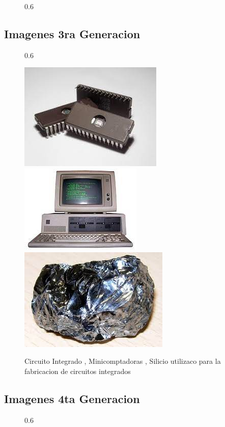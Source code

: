 \documentclass[11pt]{article}
\begin{document}
\begin{multicols}{2}
\begin{figure}{0.6\linewidth}
  \end{figure} 


  \subsection{Imagenes 3ra Generacion}
  
  \begin{figure}{0.6\linewidth}
  
  \centering
  \includegraphics[width=0.3\linewidth]{integrado.jpeg}
  \includegraphics[width=0.3\linewidth]{mini.jpeg}
  \includegraphics[width=0.3\linewidth]{silicon.jpeg}
  \caption{Circuito Integrado , Minicomptadoras , Silicio utilizaco para la fabricacion de circuitos integrados}
  
  \end{figure} 

  \subsection{Imagenes 4ta Generacion}
  
  \begin{figure}{0.6\linewidth}
  

\end{figure}
\end{multicols}
\end{document}
